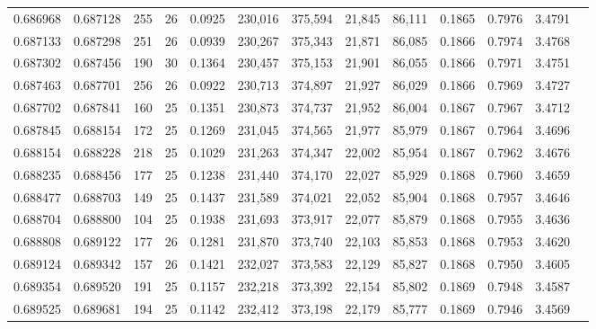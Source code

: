 \begin{tabular}{rrrrrrrrrrrrr}
0.686968 & 0.687128 &   255 &  26 &                                     0.0925 & 230,016 & 375,594 &  21,845 &  86,111 & 0.1865 & 0.7976 & 3.4791 \\
0.687133 & 0.687298 &   251 &  26 &                                     0.0939 & 230,267 & 375,343 &  21,871 &  86,085 & 0.1866 & 0.7974 & 3.4768 \\
0.687302 & 0.687456 &   190 &  30 &                                     0.1364 & 230,457 & 375,153 &  21,901 &  86,055 & 0.1866 & 0.7971 & 3.4751 \\
0.687463 & 0.687701 &   256 &  26 &                                     0.0922 & 230,713 & 374,897 &  21,927 &  86,029 & 0.1866 & 0.7969 & 3.4727 \\
0.687702 & 0.687841 &   160 &  25 &                                     0.1351 & 230,873 & 374,737 &  21,952 &  86,004 & 0.1867 & 0.7967 & 3.4712 \\
0.687845 & 0.688154 &   172 &  25 &                                     0.1269 & 231,045 & 374,565 &  21,977 &  85,979 & 0.1867 & 0.7964 & 3.4696 \\
0.688154 & 0.688228 &   218 &  25 &                                     0.1029 & 231,263 & 374,347 &  22,002 &  85,954 & 0.1867 & 0.7962 & 3.4676 \\
0.688235 & 0.688456 &   177 &  25 &                                     0.1238 & 231,440 & 374,170 &  22,027 &  85,929 & 0.1868 & 0.7960 & 3.4659 \\
0.688477 & 0.688703 &   149 &  25 &                                     0.1437 & 231,589 & 374,021 &  22,052 &  85,904 & 0.1868 & 0.7957 & 3.4646 \\
0.688704 & 0.688800 &   104 &  25 &                                     0.1938 & 231,693 & 373,917 &  22,077 &  85,879 & 0.1868 & 0.7955 & 3.4636 \\
0.688808 & 0.689122 &   177 &  26 &                                     0.1281 & 231,870 & 373,740 &  22,103 &  85,853 & 0.1868 & 0.7953 & 3.4620 \\
0.689124 & 0.689342 &   157 &  26 &                                     0.1421 & 232,027 & 373,583 &  22,129 &  85,827 & 0.1868 & 0.7950 & 3.4605 \\
0.689354 & 0.689520 &   191 &  25 &                                     0.1157 & 232,218 & 373,392 &  22,154 &  85,802 & 0.1869 & 0.7948 & 3.4587 \\
0.689525 & 0.689681 &   194 &  25 &                                     0.1142 & 232,412 & 373,198 &  22,179 &  85,777 & 0.1869 & 0.7946 & 3.4569 \\

\end{tabular}
